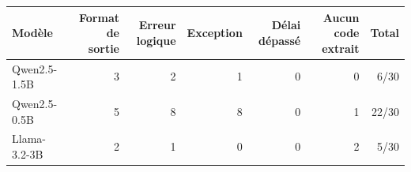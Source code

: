 \begin{tabular}{lrrrrrr}
\toprule
Modèle & Format de sortie & Erreur logique & Exception & Délai dépassé & Aucun code extrait & Total \\
\midrule
Qwen2.5-1.5B & 3 & 2 & 1 & 0 & 0 & 6/30 \\
Qwen2.5-0.5B & 5 & 8 & 8 & 0 & 1 & 22/30 \\
Llama-3.2-3B & 2 & 1 & 0 & 0 & 2 & 5/30 \\
\bottomrule
\end{tabular}
